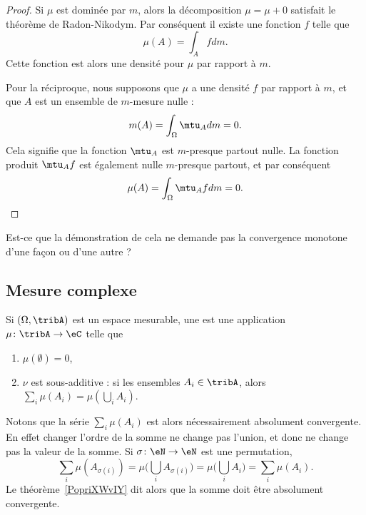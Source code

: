 	\begin{proof}
	Si \( \mu\) est dominée par \( m\), alors la décomposition \( \mu=\mu+0\) satisfait le théorème de Radon-Nikodym. Par conséquent il existe une fonction \( f\) telle que
	\begin{equation}
	\mu(A)=\int_Afdm.
	\end{equation}
	Cette fonction est alors une densité pour \( \mu\) par rapport à \( m\).

	Pour la réciproque, nous supposons que \( \mu\) a une densité \( f\) par rapport à \( m\), et que \( A\) est un ensemble de \( m\)-mesure nulle :
	\begin{equation}
	m(A)=\int_{\Omega}\mtu_Adm=0.
	\end{equation}
	Cela signifie que la fonction \( \mtu_A\) est \( m\)-presque partout nulle. La fonction produit \( \mtu_Af\) est également nulle \( m\)-presque partout, et par conséquent
	\begin{equation}
	\mu(A)=\int_{\Omega}\mtu_Afdm=0.
	\end{equation}
	\end{proof}

	\begin{probleme}
	Est-ce que la démonstration de cela ne demande pas la convergence monotone d'une façon ou d'une autre ?
	\end{probleme}

	\subsection{Mesure complexe}

	\begin{definition} \label{DefGKHLooYjocEt}
	Si \( (\Omega,\tribA)\) est un espace mesurable, une  est une application \( \mu\colon \tribA\to \eC\) telle que
	\begin{enumerate}
	\item
	\( \mu(\emptyset)=0\),
	\item
	\( \nu\) est sous-additive : si les ensembles \( A_i\in\tribA\), alors \( \sum_i\mu(A_i)=\mu(\bigcup_iA_i)\).
	\end{enumerate}
	\end{definition}
	Notons que la série \( \sum_i\mu(A_i)\) est alors nécessairement absolument convergente. En effet changer l'ordre de la somme ne change pas l'union, et donc ne change pas la valeur de la somme. Si \( \sigma\colon \eN\to \eN\) est une permutation,
	\begin{equation}
	\sum_i\mu(A_{\sigma(i)})=\mu\big( \bigcup_iA_{\sigma(i)} \big)=\mu\big( \bigcup_iA_i \big)=\sum_i\mu(A_i).
	\end{equation}
	Le théorème~\ref{PopriXWvIY} dit alors que la somme doit être absolument convergente.


